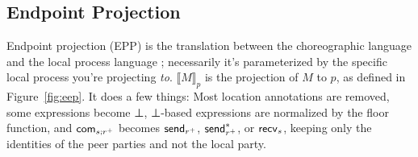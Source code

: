 \subsection{Endpoint Projection}\label{sec:projection}
Endpoint projection (EPP) is the translation between the choreographic language \HLSCentral
and the local process language \HLSLocal;
necessarily it's parameterized by the specific
local process you're projecting \emph{to}.
$⟦M⟧_p$ is the projection of $M$ to $p$, as defined in Figure~\ref{fig:eep}.
It does a few things:
Most location annotations are removed, some expressions become ⊥,
⊥-based expressions are normalized by the floor function,
and $\operatorname{\mathsf{com}}_{s;{r^{+}}}$ becomes $\operatorname{\mathsf{send}}_{{r^{+}}}$, $\operatorname{\mathsf{send}}_{{r^{+}}}^{\ast}$, or $\operatorname{\mathsf{recv}}_{s}$,
keeping only the identities of the peer parties and not the local party.

